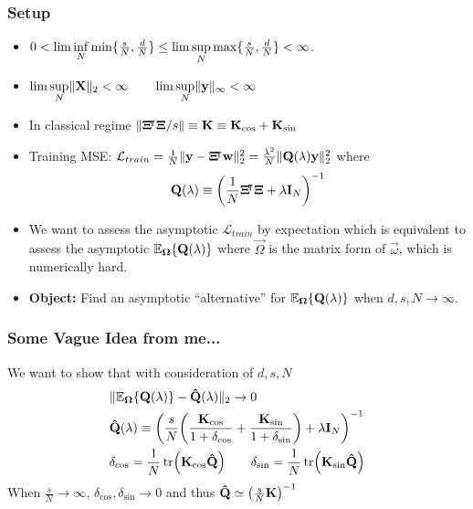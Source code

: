 \documentclass[10pt]{../formats/RU}
\begin{document}
\begin{frame}
  \frametitle{Setup}
  \begin{itemize}
    \item $0< \lim\inf\limits_N\min\braces{\frac{s}{N},\frac{d}{N}}\leq \lim\sup\limits_N\max\braces{\frac{s}{N},\frac{d}{N}}<\infty$.
    \item $\lim\sup\limits_N\norm{\mathbf{X}}_2<\infty \qquad \lim\sup\limits_N\norm{\vec{y}}_{\infty}<\infty$
    \item In classical regime $\norm{\mathbf{\Xi}\trn\mathbf{\Xi}/s}\equiv \mathbf{K}\equiv\mathbf{K}_{\cos}+\mathbf{K}_{\sin}$
    \item Training MSE: $\mathcal{L}_{train}=\frac{1}{N}\norm{\vec{y}-\mathbf{\Xi}\trn\vec{w}}_2^2=\frac{\lambda^2}{N}\norm{\mathbf{Q}(\lambda)\vec{y}}_2^2$ where
    \begin{align*}
      \mathbf{Q}(\lambda)\equiv\parens*{\frac{1}{N}\mathbf{\Xi}\trn\mathbf{\Xi}+\lambda\mathbf{I}_N}^{-1}
    \end{align*}
    \item We want to assess the asymptotic $\mathcal{L}_{train}$ by expectation which is equivalent to assess the asymptotic $\mathbb{E}_{\vec{\Omega}}\braces{\mathbf{Q}(\lambda)}$ where $\vec{\Omega}$ is the matrix form of $\vec{\omega}$, which is numerically hard.
    \item \textbf{Object:} Find an asymptotic ``alternative'' for $\mathbb{E}_{\vec{\Omega}}\braces{\mathbf{Q}(\lambda)}$ when $d, s, N\rightarrow\infty$.
  \end{itemize}
\end{frame}
\begin{frame}
  \frametitle{Some Vague Idea from me...}
  We want to show that with consideration of $d, s, N$
  \begin{align*}
    &\norm{\mathbb{E}_{\vec{\Omega}}\braces{\mathbf{Q}(\lambda)}-\mathbf{\hat{Q}}(\lambda)}_2\rightarrow 0 \\
    &\mathbf{\hat{Q}}(\lambda)\equiv\parens*{\frac{s}{N}\parens*{\frac{\vec{K}_{\cos}}{1+\delta_{\cos}}+\frac{\vec{K}_{\sin}}{1+\delta_{\sin}}}+\lambda\mathbf{I}_N}^{-1} \\
    &\delta_{\cos}=\frac{1}{N}\tr\parens*{\vec{K}_{\cos}\vec{\hat{\vec{Q}}}} \qquad \delta_{\sin}=\frac{1}{N}\tr\parens*{\vec{K}_{\sin}\vec{\hat{\vec{Q}}}}
  \end{align*}
  When $\frac{s}{N}\rightarrow\infty$, $\delta_{\cos},\delta_{\sin}\rightarrow 0$ and thus $\mathbf{\hat{Q}}\simeq \parens*{\frac{s}{N}\mathbf{K}}^{-1}$
\end{frame}
\end{document}
